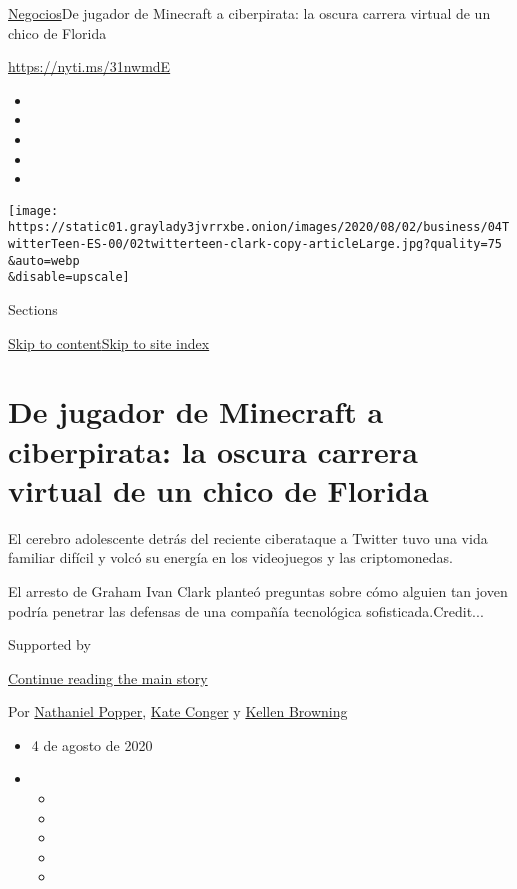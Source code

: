 \href{/es/section/negocios}{Negocios}\textbar{}De jugador de Minecraft a
ciberpirata: la oscura carrera virtual de un chico de Florida

\url{https://nyti.ms/31nwmdE}

\begin{itemize}
\item
\item
\item
\item
\item
\end{itemize}

\texttt{[image: https://static01.graylady3jvrrxbe.onion/images/2020/08/02/business/04TwitterTeen-ES-00/02twitterteen-clark-copy-articleLarge.jpg?quality=75\\\&auto=webp\\\&disable=upscale]}

Sections

\protect\hyperlink{site-content}{Skip to
content}\protect\hyperlink{site-index}{Skip to site index}

\hypertarget{de-jugador-de-minecraft-a-ciberpirata-la-oscura-carrera-virtual-de-un-chico-de-florida}{%
\section{De jugador de Minecraft a ciberpirata: la oscura carrera
virtual de un chico de
Florida}\label{de-jugador-de-minecraft-a-ciberpirata-la-oscura-carrera-virtual-de-un-chico-de-florida}}

El cerebro adolescente detrás del reciente ciberataque a Twitter tuvo
una vida familiar difícil y volcó su energía en los videojuegos y las
criptomonedas.

El arresto de Graham Ivan Clark planteó preguntas sobre cómo alguien tan
joven podría penetrar las defensas de una compañía tecnológica
sofisticada.Credit...

Supported by

\protect\hyperlink{after-sponsor}{Continue reading the main story}

Por
\href{https://www.nytimes3xbfgragh.onion/by/nathaniel-popper}{Nathaniel
Popper}, \href{https://www.nytimes3xbfgragh.onion/by/kate-conger}{Kate
Conger} y
\href{https://www.nytimes3xbfgragh.onion/by/kellen-browning}{Kellen
Browning}

\begin{itemize}
\item
  4 de agosto de 2020
\item
  \begin{itemize}
  \item
  \item
  \item
  \item
  \item
  \end{itemize}
\end{itemize}

